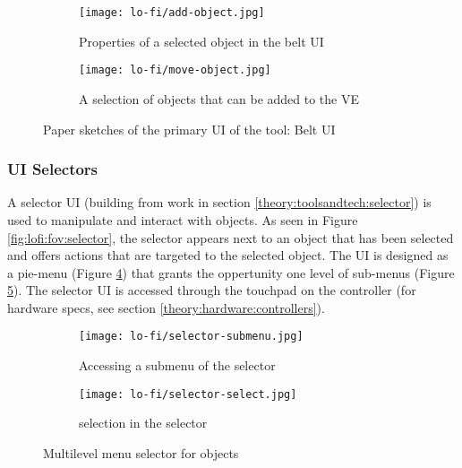 
\begin{figure}
\begin{subfigure}{.5\textwidth}
  \centering
  \texttt{[image: lo-fi/add-object.jpg]}
  \caption{Properties of a selected object in the belt UI}
  \label{fig:lofi:object:add}
\end{subfigure}%
\begin{subfigure}{.5\textwidth}
  \centering
  \texttt{[image: lo-fi/move-object.jpg]}
  \caption{A selection of objects that can be added to the VE}
  \label{fig:lofi:object:move}
\end{subfigure}
\caption{Paper sketches of the primary UI of the tool: Belt UI}
\label{fig:lofi:object}
\end{figure}


\subsubsection{UI Selectors}
\label{result:lofi:selector}
A selector UI (building from work in section \ref{theory:toolsandtech:selector}) is used to manipulate and interact with objects. As seen in Figure \ref{fig:lofi:fov:selector}, the selector appears next to an object that has been selected and offers actions that are targeted to the selected object. The UI is designed as a pie-menu (Figure \ref{fig:lofi:selector:select}) that grants the oppertunity one level of sub-menus (Figure \ref{fig:lofi:selector:submenu}). The selector UI is accessed through the touchpad on the controller (for hardware specs, see section \ref{theory:hardware:controllers}).


\begin{figure}
\begin{subfigure}{.5\textwidth}
  \centering
  \texttt{[image: lo-fi/selector-submenu.jpg]}
  \caption{Accessing a submenu of the selector}
  \label{fig:lofi:selector:select}
\end{subfigure}%
\begin{subfigure}{.5\textwidth}
  \centering
  \texttt{[image: lo-fi/selector-select.jpg]}
  \caption{selection in the selector}
  \label{fig:lofi:selector:submenu}
\end{subfigure}
\caption{Multilevel menu selector for objects}
\label{fig:lofi:selector}
\end{figure}


